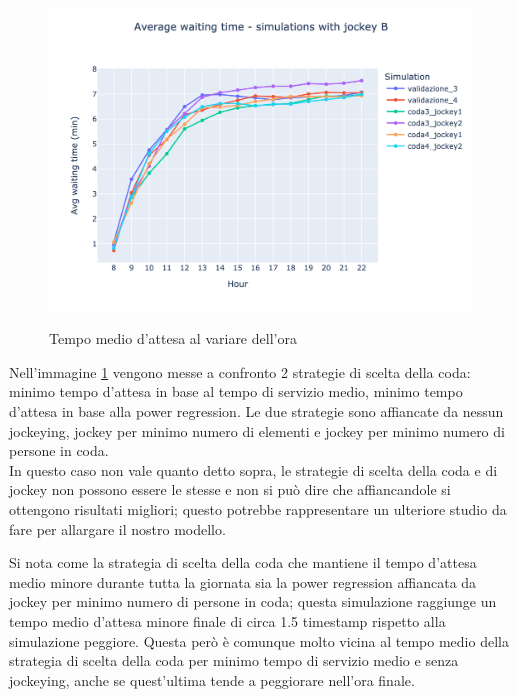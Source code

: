 \begin{figure}[H]
	\centering
	\includegraphics[width=12cm]{"images/results/avg_wt_jockey_b.png"}
	\label{fig:avg_wt_jockey_b}
	\caption{Tempo medio d'attesa al variare dell'ora}
\end{figure}

Nell'immagine \ref{fig:avg_wt_jockey_b} vengono messe a confronto 2 strategie di scelta della coda: minimo tempo d'attesa in base al tempo di servizio medio, minimo tempo d'attesa in base alla power regression. Le due strategie sono affiancate da nessun jockeying, jockey per minimo numero di elementi e jockey per minimo numero di persone in coda. \\
In questo caso non vale quanto detto sopra, le strategie di scelta della coda e di jockey non possono essere le stesse e non si può dire che affiancandole si ottengono risultati migliori; questo potrebbe rappresentare un ulteriore studio da fare per allargare il nostro modello.

Si nota come la strategia di scelta della coda che mantiene il tempo d'attesa medio minore durante tutta la giornata sia la power regression affiancata da jockey per minimo numero di persone in coda; questa simulazione raggiunge un tempo medio d'attesa minore finale di circa 1.5 timestamp rispetto alla simulazione peggiore. Questa però è comunque molto vicina al tempo medio della strategia di scelta della coda per minimo tempo di servizio medio e senza jockeying, anche se quest'ultima tende a peggiorare nell'ora finale.

